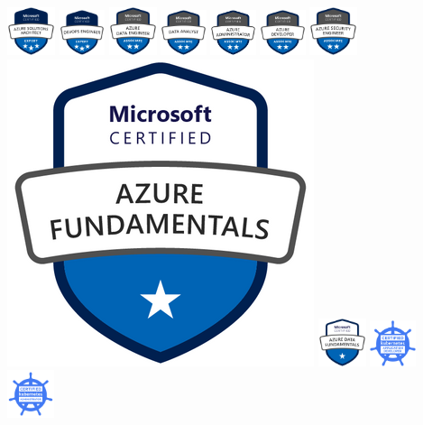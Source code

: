 \documentclass[10pt,a4paper,normalphoto]{altacv}
\begin{document}
\begin{paracol}{2}
\includegraphics[width=0.105\textwidth]{azure-solutions-architect-expert-600x600.png}
\includegraphics[width=0.1\textwidth]{CERT-Expert-DevOps-Engineer-600x600.png}
\includegraphics[width=0.105\textwidth]{data-eng-az}
\includegraphics[width=0.1\textwidth]{CERT-Associate-Data-Analyst-600x600.png}
\includegraphics[width=0.1\textwidth]{azure-administrator-associate.png}
\includegraphics[width=0.1\textwidth]{azure-developer-associate-600x600.png}
\includegraphics[width=0.105\textwidth]{security-engineer.png}
\includegraphics[width=0.1 \textwidth]{azure-900.png}
\includegraphics[width=0.105\textwidth]{data-fund}
\includegraphics[width=0.1\textwidth]{ckad_from_cncfsite.png}
\includegraphics[width=0.104\textwidth]{cka.png}


\end{paracol}
\end{document}
